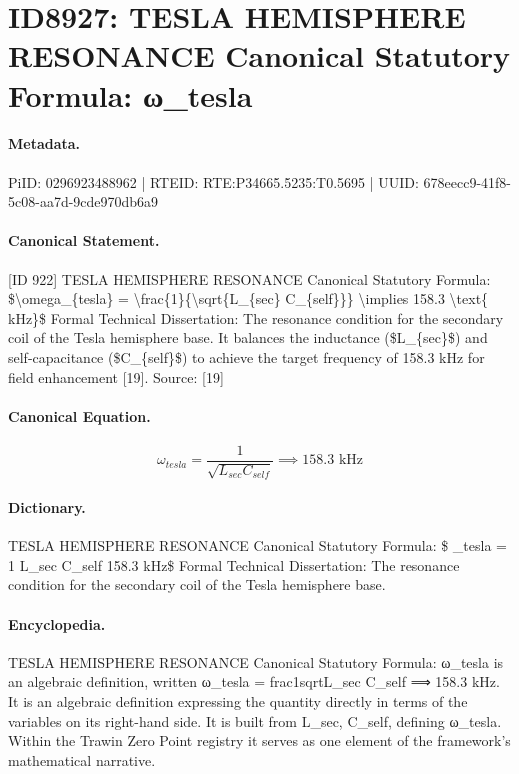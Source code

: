 \section*{ID8927: TESLA HEMISPHERE RESONANCE Canonical Statutory Formula: ω\_tesla}
\paragraph{Metadata.}
PiID: 0296923488962 | RTEID: RTE:P34665.5235:T0.5695 | UUID: 678eecc9-41f8-5c08-aa7d-9cde970db6a9

\paragraph{Canonical Statement.}
[ID 922] TESLA HEMISPHERE RESONANCE Canonical Statutory Formula: \$\textbackslash{}omega\_\{tesla\} = \textbackslash{}frac\{1\}\{\textbackslash{}sqrt\{L\_\{sec\} C\_\{self\}\}\} \textbackslash{}implies 158.3 \textbackslash{}text\{ kHz\}\$ Formal Technical Dissertation: The resonance condition for the secondary coil of the Tesla hemisphere base. It balances the inductance (\$L\_\{sec\}\$) and self-capacitance (\$C\_\{self\}\$) to achieve the target frequency of 158.3 kHz for field enhancement [19]. Source: [19]

\paragraph{Canonical Equation.}
\[
\omega_{tesla} = \frac{1}{\sqrt{L_{sec} C_{self}}} \implies 158.3 \text{ kHz}
\]

\paragraph{Dictionary.}
TESLA HEMISPHERE RESONANCE Canonical Statutory Formula: \$ \_tesla = 1 L\_sec C\_self 158.3 kHz\$ Formal Technical Dissertation: The resonance condition for the secondary coil of the Tesla hemisphere base.

\paragraph{Encyclopedia.}
TESLA HEMISPHERE RESONANCE Canonical Statutory Formula: ω\_tesla is an algebraic definition, written ω\_tesla = frac1sqrtL\_sec C\_self ⟹ 158.3 kHz. It is an algebraic definition expressing the quantity directly in terms of the variables on its right-hand side. It is built from L\_sec, C\_self, defining ω\_tesla. Within the Trawin Zero Point registry it serves as one element of the framework's mathematical narrative.

